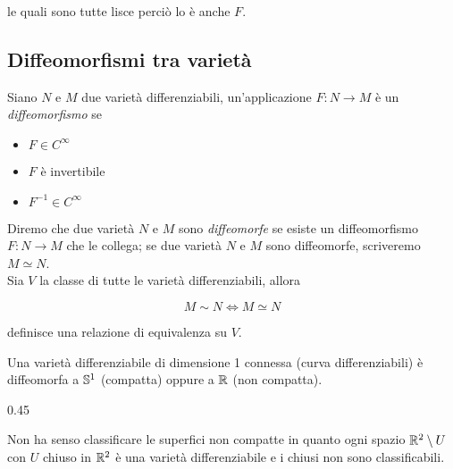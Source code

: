 le quali sono tutte lisce perciò lo è anche $ F $.

\subsection{Diffeomorfismi tra varietà}\label{s-sec:diff}

Siano $ N $ e $ M $ due varietà differenziabili, un'applicazione $ F : N \to M $ è un \textit{diffeomorfismo} se

\begin{itemize}
	\item $ F \in C^{\infty} $
	
	\item $ F $ è invertibile
	
	\item $ F^{-1} \in C^{\infty} $
\end{itemize}

Diremo che due varietà $ N $ e $ M $ sono \textit{diffeomorfe} se esiste un diffeomorfismo $ F : N \to M $ che le collega; se due varietà $ N $ e $ M $ sono diffeomorfe, scriveremo $ M \simeq N $. \\
Sia $ V $ la classe di tutte le varietà differenziabili, allora

\begin{equation}
	M \sim N \iff M \simeq N
\end{equation}

definisce una relazione di equivalenza su $ V $.

\begin{theorem}
	Una varietà differenziabile di dimensione 1 connessa (curva differenziabili) è diffeomorfa a $ \S^{1} $ (compatta) oppure a $ \R $ (non compatta).
\end{theorem}

{0.45}{
}

\begin{remark}
	Non ha senso classificare le superfici non compatte in quanto ogni spazio $ \R^{2} \setminus U $ con $ U $ chiuso in $ \R^{2} $ è una varietà differenziabile e i chiusi non sono classificabili.
\end{remark}


